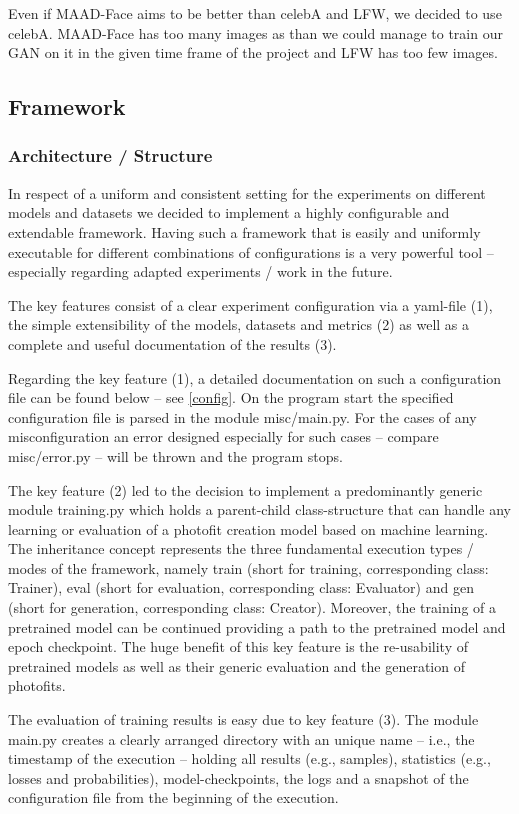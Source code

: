 \documentclass[12pt, a4paper]{article}
\begin{document}
Even if MAAD-Face aims to be better than celebA and LFW, we decided to use celebA.
MAAD-Face has too many images as than we could manage to train our GAN on it in the given time frame of the project and LFW has too few images.

\subsection{Framework}
\subsubsection{Architecture / Structure}
In respect of a uniform and consistent setting for the experiments on different models and datasets we decided to
implement a highly configurable and extendable framework.
Having such a framework that is easily and uniformly executable for different combinations of configurations is a very
powerful tool -- especially regarding adapted experiments / work in the future.

The key features consist of a clear experiment configuration via a yaml-file (1), the simple extensibility of the models,
datasets and metrics (2) as well as a complete and useful documentation of the results (3).

Regarding the key feature (1), a detailed documentation on such a configuration file can be found below --
see \ref{config}.
On the program start the specified configuration file is parsed in the module misc/main.py.
For the cases of any misconfiguration an error designed especially for such cases -- compare misc/error.py -- will be
thrown and the program stops.

The key feature (2) led to the decision to implement a predominantly generic module training.py which holds a
parent-child class-structure that can handle any learning or evaluation of a photofit creation model based on machine
learning.
The inheritance concept represents the three fundamental execution types / modes of the framework, namely train
(short for training, corresponding class: Trainer), eval (short for evaluation, corresponding class: Evaluator) and gen
(short for generation, corresponding class: Creator).
Moreover, the training of a pretrained model can be continued providing a path to the pretrained model and epoch
checkpoint.
The huge benefit of this key feature is the re-usability of pretrained models as well as their generic evaluation and
the generation of photofits.

The evaluation of training results is easy due to key feature (3).
The module main.py creates a clearly arranged directory with an unique name -- i.e., the timestamp of the execution --
holding all results (e.g., samples), statistics (e.g., losses and probabilities), model-checkpoints, the logs and a
snapshot of the configuration file from the beginning of the execution.
\end{document}

